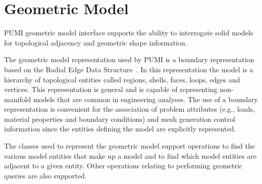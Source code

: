 \section{Geometric Model}  

PUMI geometric model interface supports the ability to interrogate solid models for topological adjacency and geometric shape information.

The geometric model representation used by PUMI is a boundary representation based on the Radial Edge Data Structure~\cite{weiler88}. In this representation the model is a hierarchy of topological entities called regions, shells, faces, loops, edges and vertices. This representation is general and is capable of representing non-manifold models that are common in engineering analyses. The use of a boundary representation is convenient for the association of problem attributes (e.g., loads, material properties and boundary conditions) and mesh generation control information since the entities defining the model are explicitly represented. 

The classes used to represent the geometric model support operations to find the various model entities that make up a model and to find which model entities are adjacent to a given entity. Other operations relating to performing geometric queries are also supported.



